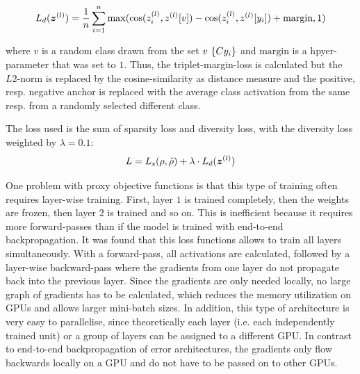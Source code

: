 \begin{equation}\eqlbl{vso_9}
		L_{d}(\boldsymbol{z}^{(l)}) = \frac{1}{n} \sum_{i=1}^{n} \max(\text{cos}(z^{(l)}_i, z^{(l)}[v]) - \text{cos}(z^{(l)}_i, z^{(l)}[y_i]) + \text{margin}, 1)
\end{equation}

where $v$ is a random class drawn from the set $v ~ \{C \\ y_i\}$ and $\text{margin}$ is a hpyer-parameter that was set to $1$.
Thus, the triplet-margin-loss is calculated but the $L2$-norm is replaced by the cosine-similarity as distance measure and the positive, resp. negative anchor is replaced with the average class activation from the same resp. from a randomly selected different class.

The loss used is the sum of sparsity loss and diversity loss, with the diversity loss weighted by $\lambda=0.1$:
\begin{equation}\eqlbl{vso_10}
		L = L_{s}(\rho, \hat{\rho}) + \lambda \cdot L_{d}(\boldsymbol{z}^{(l)}) 
\end{equation}


One problem with proxy objective functions is that this type of training often requires layer-wise training. First, layer $1$ is trained completely, then the weights are frozen, then layer $2$ is trained and so on.
This is inefficient because it requires more forward-passes than if the model is trained with end-to-end backpropagation.
It was found that this loss functions allows to train all layers simultaneously. With a forward-pass, all activations are calculated, followed by a layer-wise backward-pass where the gradients from one layer do not propagate back into the previous layer.
Since the gradients are only needed locally, no large graph of gradients has to be calculated, which reduces the memory utilization on GPUs and allows larger mini-batch sizes. In addition, this type of architecture is very easy to parallelise, since theoretically each layer (i.e. each independently trained unit) or a group of layers can be assigned to a different GPU.
In contrast to end-to-end backpropagation of error architectures, the gradients only flow backwards locally on a GPU and do not have to be passed on to other GPUs.

